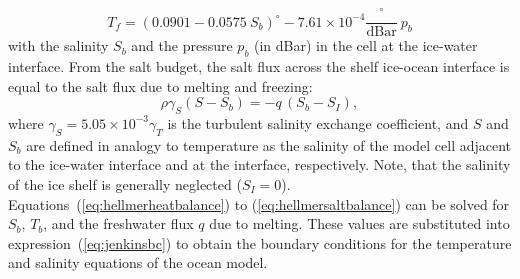 \begin{equation}
  \label{eq:helmerfreeze}
    T_{f} = (0.0901 - 0.0575\ S_{b})^{\circ}
    - 7.61 \times 10^{-4}\frac{^{\circ}}{\text{dBar}}\ p_{b} 
\end{equation}
with the salinity $S_{b}$ and the pressure $p_{b}$ (in dBar) in the
cell at the ice-water interface. From the salt budget, the salt flux
across the shelf ice-ocean interface is equal to the salt flux due to
melting and freezing:
\begin{equation}
  \label{eq:hellmersaltbalance}
  \rho \gamma_{S} (S - S_{b}) = - q\,(S_{b}-S_{I}),
\end{equation}
where $\gamma_S = 5.05\times10^{-3}\gamma_T$ is the turbulent salinity
exchange coefficient, and $S$ and $S_{b}$ are defined in analogy to
temperature as the salinity of the model cell adjacent to the
ice-water interface and at the interface, respectively. Note, that the
salinity of the ice shelf is generally neglected ($S_{I}=0$).
Equations~(\ref{eq:hellmerheatbalance}) to (\ref{eq:hellmersaltbalance}) can
be solved for $S_{b}$, $T_{b}$, and the freshwater flux $q$ due to
melting. These values are substituted into expression~(\ref{eq:jenkinsbc})
to obtain the boundary conditions for the temperature and salinity
equations of the ocean model.

